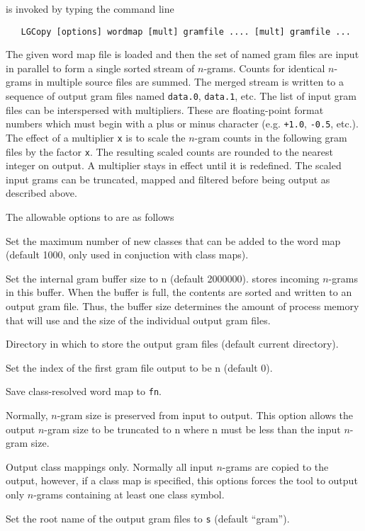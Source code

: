  is invoked by typing the command line
\begin{verbatim}
   LGCopy [options] wordmap [mult] gramfile .... [mult] gramfile ...
\end{verbatim}
The given word map file is loaded and then the set of named gram files
are input in parallel to form a single sorted stream of $n$-grams. Counts
for identical $n$-grams in multiple source files are summed.  The merged
stream is written to a sequence of output gram files named
\texttt{data.0}, \texttt{data.1}, etc. The list of input gram files
can be interspersed with multipliers. These are floating-point format
numbers which must begin with a plus or minus character
(e.g. \texttt{+1.0}, \texttt{-0.5}, etc.). The effect of a multiplier
\texttt{x} is to scale the $n$-gram counts in the following gram files by
the factor \texttt{x}. The resulting scaled counts are rounded to the
nearest integer on output. A multiplier stays in effect until it is
redefined. The scaled input grams can be truncated, mapped and
filtered before being output as described above.

The allowable options to  are as follows

\begin{optlist}

   Set the maximum number of new classes that can be
   added to the word map (default 1000, only used in conjuction with
   class maps).

   Set the internal gram buffer size to n (default
   2000000).  stores incoming $n$-grams in this buffer.
   When the buffer is full, the contents are sorted and written to an
   output gram file. Thus, the buffer size determines the amount of
   process memory that  will use and the size of the
   individual output gram files.

   Directory in which to store the output gram files
   (default current directory).

   Set the index of the first gram file output to be n
   (default 0).

   Save class-resolved word map to \texttt{fn}.

   Normally, $n$-gram size is preserved from input to
   output.  This option allows the output $n$-gram size to be truncated
   to n where n must be less than the input $n$-gram size.

   Output class mappings only. Normally all input $n$-grams
   are copied to the output, however, if a class map is specified, this
   options forces the tool to output only $n$-grams containing at least
   one class symbol.

   Set the root name of the output gram files to
   \texttt{s} (default ``gram'').

\end{optlist}


